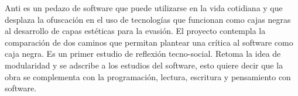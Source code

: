 Anti es un pedazo de software que puede utilizarse en la vida cotidiana y que desplaza la ofuscación en el uso de tecnologías que funcionan como cajas negras al desarrollo de capas estéticas para la evasión. El proyecto contempla la comparación de dos caminos que permitan plantear una crítica al software como caja negra. Es un primer estudio de reflexión tecno-social. Retoma la idea de modularidad y se adscribe a los estudios del software, esto quiere decir que la obra se complementa con la programación, lectura, escritura y pensamiento con software.

\iffalse

- Videotitlán ?
- THREE.studies
- ¿anti? 
\fi
